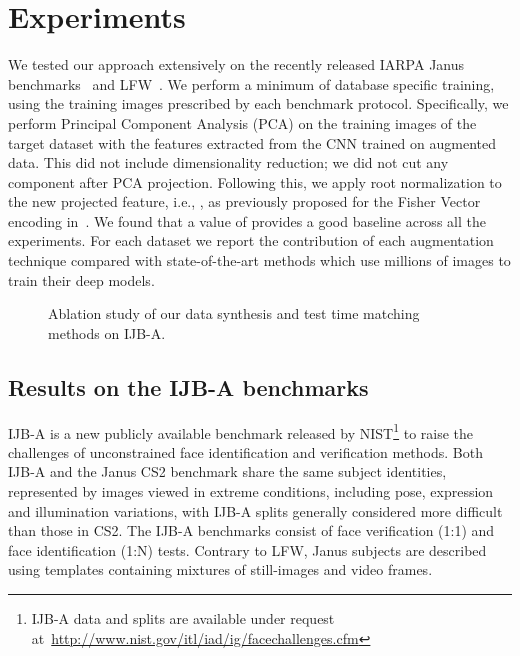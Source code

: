 \documentclass[runningheads]{llncs}
\begin{document}
\section{Experiments}\label{sec:experiments}
We tested our approach extensively on the recently released IARPA Janus benchmarks~\cite{klare2015pushing} and LFW~\cite{LFWTech}. We perform a minimum of database specific  training, using the training images prescribed by each benchmark protocol. Specifically, we perform Principal Component Analysis (PCA) on the training images of the target dataset with the features  extracted from the CNN trained on augmented data. This did not include dimensionality reduction; we did not cut any component after PCA projection. Following this, we apply root normalization to the new projected feature, i.e., , as previously proposed for the Fisher Vector encoding in~\cite{sanchez2013image}. We found that a value of  provides a good baseline across all the experiments.
For each dataset we report the contribution of each augmentation technique compared with state-of-the-art methods which use millions of images to train their deep models.
\begin{figure}[t]
\centering
{}
\caption{Ablation study of our data synthesis and test time matching methods on IJB-A.}
\label{fig:ijba-ablation}
\vspace{-3mm}
\end{figure}
\subsection{Results on the IJB-A benchmarks}\label{sec:janus}
IJB-A is a new publicly available benchmark released by NIST\footnote{IJB-A data and splits are available under request at~\url{http://www.nist.gov/itl/iad/ig/facechallenges.cfm}} to raise the challenges of unconstrained face identification and verification methods. Both IJB-A and the Janus CS2 benchmark share the same subject identities, represented by images viewed in extreme conditions, including pose, expression and illumination variations, with IJB-A splits generally considered more difficult than those in CS2. The IJB-A benchmarks consist of face verification (1:1) and face identification (1:N) tests. Contrary to LFW, Janus subjects are described using templates containing mixtures of still-images and video frames. 
\end{document}
